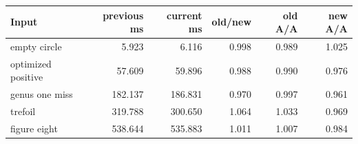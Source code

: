 \begin{center}
\small
\begin{tabular}{lrrrrr}
\toprule
Input & previous ms & current ms & old/new & old A/A & new A/A\\
\midrule
empty circle & 5.923 & 6.116 & 0.998 & 0.989 & 1.025\\
optimized positive & 57.609 & 59.896 & 0.988 & 0.990 & 0.976\\
genus one miss & 182.137 & 186.831 & 0.970 & 0.997 & 0.961\\
trefoil & 319.788 & 300.650 & 1.064 & 1.033 & 0.969\\
figure eight & 538.644 & 535.883 & 1.011 & 1.007 & 0.984\\
\bottomrule
\end{tabular}
\end{center}
